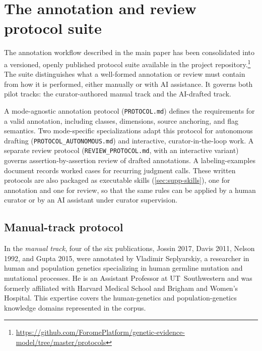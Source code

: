 
\section{The annotation and review protocol suite}
\label{sec:supp-protocol-suite}

The annotation workflow described in the main paper has been consolidated
into a versioned, openly published protocol suite available in the project
repository.\footnote{\url{https://github.com/ForomePlatform/genetic-evidence-model/tree/master/protocols}}
The suite distinguishes what a well-formed annotation or review must contain
from how it is performed, either manually or with AI assistance. It governs
both pilot tracks: the curator-authored manual track and the AI-drafted
track.

A mode-agnostic annotation protocol (\texttt{PROTOCOL.md}) defines the
requirements for a valid annotation, including classes, dimensions, source
anchoring, and flag semantics. Two mode-specific specializations adapt this
protocol for autonomous drafting (\texttt{PROTOCOL\_AUTONOMOUS.md}) and
interactive, curator-in-the-loop work. A separate review protocol
(\texttt{REVIEW\_PROTOCOL.md}, with an interactive variant) governs
assertion-by-assertion review of drafted annotations. A labeling-examples
document records worked cases for recurring judgment calls. These written
protocols are also packaged as executable skills
(\cref{sec:supp-skills}), one for annotation and one for review, so that the
same rules can be applied by a human curator or by an AI assistant under
curator supervision.

\subsection{Manual-track protocol}

In the \emph{manual track}, four of the six publications, Jossin 2017,
Davis 2011, Nelson 1992, and Gupta 2015, were annotated by Vladimir
Seplyarskiy, a researcher in human and population genetics specializing in
human germline mutation and mutational processes. He is an Assistant
Professor at UT~Southwestern and was formerly affiliated with Harvard Medical
School and Brigham and Women's Hospital. This expertise covers the
human-genetics and population-genetics knowledge domains represented in the
corpus.

